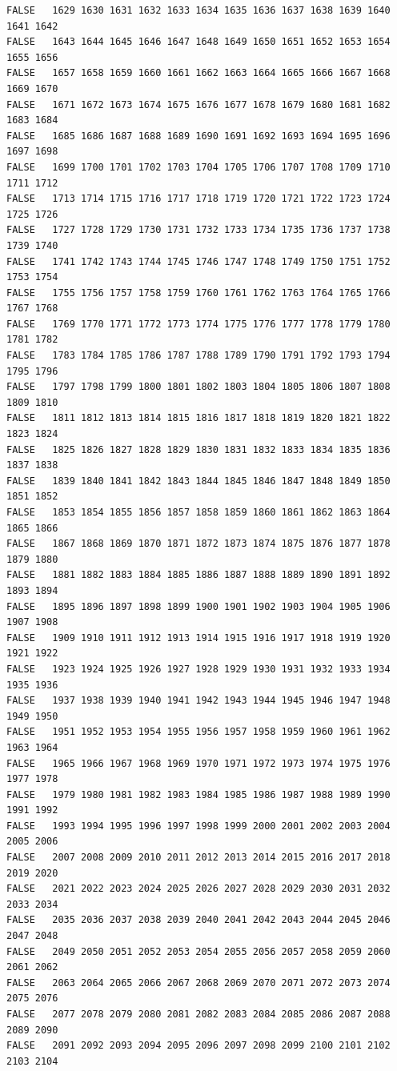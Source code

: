 \documentclass[]{article}
\begin{document}
\begin{verbatim}
FALSE   1629 1630 1631 1632 1633 1634 1635 1636 1637 1638 1639 1640 1641 1642
FALSE   1643 1644 1645 1646 1647 1648 1649 1650 1651 1652 1653 1654 1655 1656
FALSE   1657 1658 1659 1660 1661 1662 1663 1664 1665 1666 1667 1668 1669 1670
FALSE   1671 1672 1673 1674 1675 1676 1677 1678 1679 1680 1681 1682 1683 1684
FALSE   1685 1686 1687 1688 1689 1690 1691 1692 1693 1694 1695 1696 1697 1698
FALSE   1699 1700 1701 1702 1703 1704 1705 1706 1707 1708 1709 1710 1711 1712
FALSE   1713 1714 1715 1716 1717 1718 1719 1720 1721 1722 1723 1724 1725 1726
FALSE   1727 1728 1729 1730 1731 1732 1733 1734 1735 1736 1737 1738 1739 1740
FALSE   1741 1742 1743 1744 1745 1746 1747 1748 1749 1750 1751 1752 1753 1754
FALSE   1755 1756 1757 1758 1759 1760 1761 1762 1763 1764 1765 1766 1767 1768
FALSE   1769 1770 1771 1772 1773 1774 1775 1776 1777 1778 1779 1780 1781 1782
FALSE   1783 1784 1785 1786 1787 1788 1789 1790 1791 1792 1793 1794 1795 1796
FALSE   1797 1798 1799 1800 1801 1802 1803 1804 1805 1806 1807 1808 1809 1810
FALSE   1811 1812 1813 1814 1815 1816 1817 1818 1819 1820 1821 1822 1823 1824
FALSE   1825 1826 1827 1828 1829 1830 1831 1832 1833 1834 1835 1836 1837 1838
FALSE   1839 1840 1841 1842 1843 1844 1845 1846 1847 1848 1849 1850 1851 1852
FALSE   1853 1854 1855 1856 1857 1858 1859 1860 1861 1862 1863 1864 1865 1866
FALSE   1867 1868 1869 1870 1871 1872 1873 1874 1875 1876 1877 1878 1879 1880
FALSE   1881 1882 1883 1884 1885 1886 1887 1888 1889 1890 1891 1892 1893 1894
FALSE   1895 1896 1897 1898 1899 1900 1901 1902 1903 1904 1905 1906 1907 1908
FALSE   1909 1910 1911 1912 1913 1914 1915 1916 1917 1918 1919 1920 1921 1922
FALSE   1923 1924 1925 1926 1927 1928 1929 1930 1931 1932 1933 1934 1935 1936
FALSE   1937 1938 1939 1940 1941 1942 1943 1944 1945 1946 1947 1948 1949 1950
FALSE   1951 1952 1953 1954 1955 1956 1957 1958 1959 1960 1961 1962 1963 1964
FALSE   1965 1966 1967 1968 1969 1970 1971 1972 1973 1974 1975 1976 1977 1978
FALSE   1979 1980 1981 1982 1983 1984 1985 1986 1987 1988 1989 1990 1991 1992
FALSE   1993 1994 1995 1996 1997 1998 1999 2000 2001 2002 2003 2004 2005 2006
FALSE   2007 2008 2009 2010 2011 2012 2013 2014 2015 2016 2017 2018 2019 2020
FALSE   2021 2022 2023 2024 2025 2026 2027 2028 2029 2030 2031 2032 2033 2034
FALSE   2035 2036 2037 2038 2039 2040 2041 2042 2043 2044 2045 2046 2047 2048
FALSE   2049 2050 2051 2052 2053 2054 2055 2056 2057 2058 2059 2060 2061 2062
FALSE   2063 2064 2065 2066 2067 2068 2069 2070 2071 2072 2073 2074 2075 2076
FALSE   2077 2078 2079 2080 2081 2082 2083 2084 2085 2086 2087 2088 2089 2090
FALSE   2091 2092 2093 2094 2095 2096 2097 2098 2099 2100 2101 2102 2103 2104

\end{verbatim}
\end{document}
